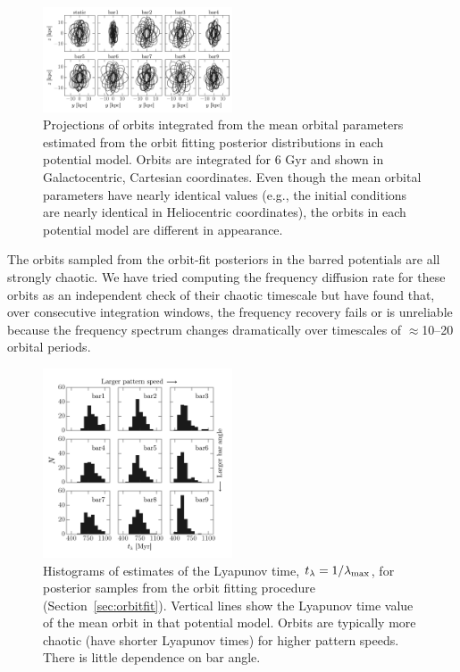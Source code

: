 \documentclass[letterpaper,12pt,preprint]{aastex}
\newcommand{\lyapexp}{\lambda_{\rm max}}
\newcommand{\lyapt}{t_\lambda}
\begin{document}
\begin{figure}[!tbp]
\begin{center}
\includegraphics[width=0.5\textwidth]{figures/orbit-yz}
\caption{  Projections of orbits integrated from the mean orbital parameters estimated from the orbit fitting posterior distributions in each potential model. Orbits are integrated for 6 Gyr and shown in Galactocentric, Cartesian coordinates. Even though the mean orbital parameters have nearly identical values (e.g., the initial conditions are nearly identical in Heliocentric coordinates), the orbits in each potential model are  different in appearance. }
\label{fig:orbits-yz}
\end{center}
\end{figure}

The orbits sampled from the orbit-fit posteriors in the barred potentials are all strongly chaotic. We have tried computing the frequency diffusion rate for these orbits as an independent check of their chaotic timescale but have found that, over consecutive integration windows, the frequency recovery fails or is unreliable because the frequency spectrum changes dramatically over timescales of $\approx$10--20 orbital periods. 

\begin{figure}[!tbp]
\begin{center}
\includegraphics[width=0.5\textwidth]{figures/lyapunov-hist}
\caption{ Histograms of estimates of the Lyapunov time, $\lyapt=1/\lyapexp$, for posterior samples from the orbit fitting procedure (Section~\ref{sec:orbitfit}). Vertical lines show the Lyapunov time value of the mean orbit in that potential model. Orbits are typically more chaotic (have shorter Lyapunov times) for higher pattern speeds. There is little dependence on bar angle.}
\label{fig:lyapunov-hist}
\end{center}
\end{figure}
\end{document}
